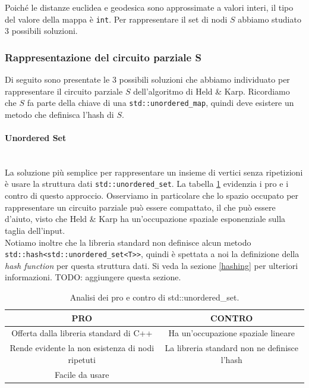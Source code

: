 \noindent Poiché le distanze euclidea e geodesica sono approssimate a valori interi, il tipo del valore della mappa è \texttt{int}.
Per rappresentare il set di nodi $S$ abbiamo studiato 3 possibili soluzioni.

\subsubsection{Rappresentazione del circuito parziale S}
\label{held-karp-S-repr}

Di seguito sono presentate le 3 possibili soluzioni che abbiamo individuato per rappresentare il circuito parziale $S$ dell'algoritmo di Held \& Karp. Ricordiamo che $S$ fa parte della chiave di una \texttt{std::unordered_map}, quindi deve esistere un metodo che definisca l'hash di $S$.

\paragraph{Unordered Set}\mbox{}\\

\noindent La soluzione più semplice per rappresentare un insieme di vertici senza ripetizioni è usare la struttura dati \texttt{std::unordered_set}. La tabella \ref{tab:pro-cons-unordered-set} evidenzia i pro e i contro di questo approccio. Osserviamo in particolare che lo spazio occupato per rappresentare un circuito parziale può essere compattato, il che può essere d'aiuto, visto che Held \& Karp ha un'occupazione spaziale esponenziale sulla taglia dell'input. \\

\noindent Notiamo inoltre che la libreria standard non definisce alcun metodo \\ \texttt{std::hash<std::unordered_set<T>>}, quindi è spettata a noi la definizione della \textit{hash function} per questa struttura dati. Si veda la sezione \ref{hashing} per ulteriori informazioni. TODO: aggiungere questa sezione.

\begin{table}[h]
  \centering
    \begin{tabular}{|c | c|}
    \hline
    \textbf{PRO} & \textbf{CONTRO} \\ [0.5ex]
    \hline\hline
    Offerta dalla libreria standard di C++ & Ha un'occupazione spaziale lineare\\
    \hline
    Rende evidente la non esistenza di nodi ripetuti & La libreria standard non ne definisce l'hash \\
    \hline
    Facile da usare &  \\
    \hline
  \end{tabular}
    \caption{Analisi dei pro e contro di std::unordered\_set.}
    \label{tab:pro-cons-unordered-set}
\end{table}


